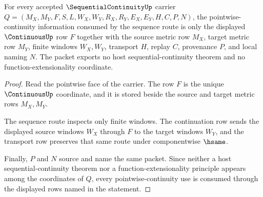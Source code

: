 \begin{theorem}
\label{thm:sequential-continuity-pointwise-consumption}
For every accepted $\SequentialContinuityUp$ carrier $Q=(M_X,M_Y,F,S,L,W_X,W_Y,R_X,R_Y,E_X,E_Y,H,C,P,N)$, the pointwise-continuity information consumed by the sequence route is only the displayed $\ContinuousUp$ row $F$ together with the source metric row $M_X$, target metric row $M_Y$, finite windows $W_X,W_Y$, transport $H$, replay $C$, provenance $P$, and local naming $N$. The packet exports no host sequential-continuity theorem and no function-extensionality coordinate.
\end{theorem}
\begin{proof}
Read the pointwise face of the carrier. The row $F$ is the unique $\ContinuousUp$ coordinate, and it is stored beside the source and target metric rows $M_X,M_Y$.

The sequence route inspects only finite windows. The continuation row sends the displayed source windows $W_X$ through $F$ to the target windows $W_Y$, and the transport row preserves that same route under componentwise $\hsame$.

Finally, $P$ and $N$ source and name the same packet. Since neither a host sequential-continuity theorem nor a function-extensionality principle appears among the coordinates of $Q$, every pointwise-continuity use is consumed through the displayed rows named in the statement.
\end{proof}

